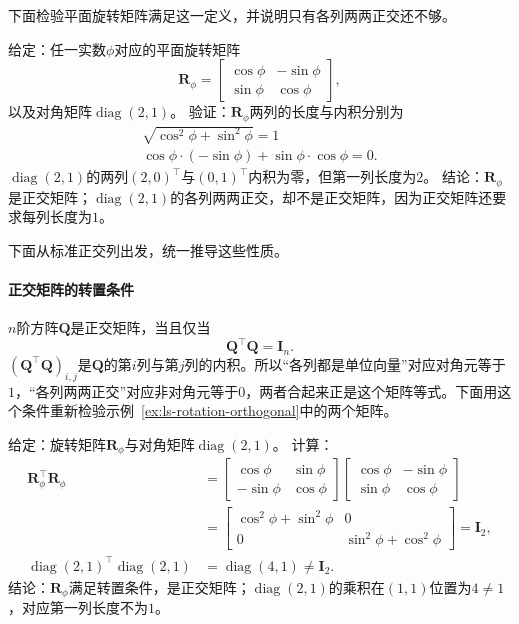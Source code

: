 下面检验平面旋转矩阵满足这一定义，并说明只有各列两两正交还不够。
\begin{example}[平面旋转是正交矩阵]
\label{ex:ls-rotation-orthogonal}
给定：任一实数$\phi$对应的平面旋转矩阵
\[
 \bm R_\phi=\begin{bmatrix}\cos\phi&-\sin\phi\\\sin\phi&\cos\phi\end{bmatrix},
\]
以及对角矩阵$\operatorname{diag}(2,1)$。
验证：$\bm R_\phi$两列的长度与内积分别为
\[
 \begin{gathered}
\sqrt{\cos^2\phi+\sin^2\phi}=1\\
\cos\phi\cdot(-\sin\phi)+\sin\phi\cdot\cos\phi=0.
 \end{gathered}
\]$\operatorname{diag}(2,1)$的两列$(2,0)^\top$与$(0,1)^\top$内积为零，但第一列长度为$2$。
结论：$\bm R_\phi$是正交矩阵；$\operatorname{diag}(2,1)$的各列两两正交，却不是正交矩阵，因为正交矩阵还要求每列长度为$1$。
\end{example}
下面从标准正交列出发，统一推导这些性质。


\paragraph{正交矩阵的转置条件}
$n$阶方阵$\bm Q$是正交矩阵，当且仅当
\[
 \bm Q^\top\bm Q=\bm I_n.
\]
$(\bm Q^\top\bm Q)_{i,j}$是$\bm Q$的第$i$列与第$j$列的内积。所以“各列都是单位向量”对应对角元等于$1$，“各列两两正交”对应非对角元等于$0$，两者合起来正是这个矩阵等式。下面用这个条件重新检验示例~\ref{ex:ls-rotation-orthogonal}中的两个矩阵。
\begin{example}[用转置条件检验正交矩阵]
\label{ex:ls-orthogonality-by-transpose}
给定：旋转矩阵$\bm R_\phi$与对角矩阵$\operatorname{diag}(2,1)$。
计算：
\[
 \begin{aligned}
 \bm R_\phi^\top\bm R_\phi
 &=\begin{bmatrix}\cos\phi&\sin\phi\\-\sin\phi&\cos\phi\end{bmatrix}
   \begin{bmatrix}\cos\phi&-\sin\phi\\\sin\phi&\cos\phi\end{bmatrix}\\
 &=\begin{bmatrix}\cos^2\phi+\sin^2\phi&0\\0&\sin^2\phi+\cos^2\phi\end{bmatrix}
 =\bm I_2,\\
 \operatorname{diag}(2,1)^\top\operatorname{diag}(2,1)&=\operatorname{diag}(4,1)\neq\bm I_2.
 \end{aligned}
\]
结论：$\bm R_\phi$满足转置条件，是正交矩阵；$\operatorname{diag}(2,1)$的乘积在$(1,1)$位置为$4\neq1$，对应第一列长度不为$1$。
\end{example}


